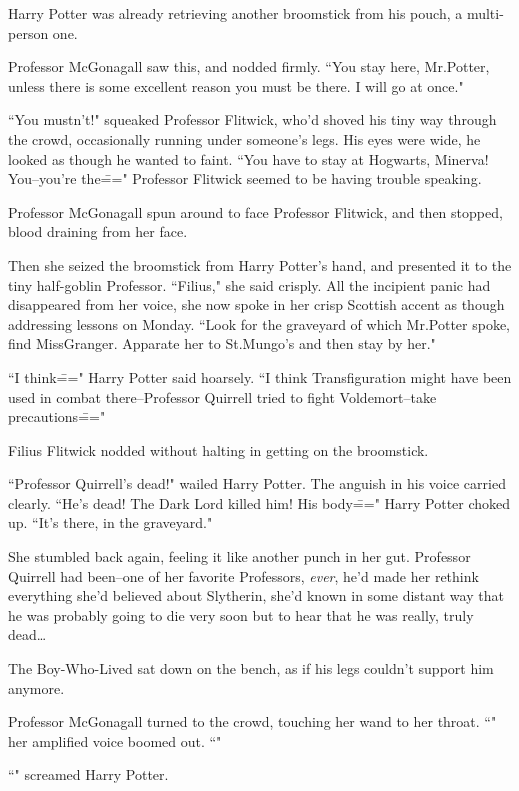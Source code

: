 Harry Potter was already retrieving another broomstick from his pouch, a multi-person one.

Professor McGonagall saw this, and nodded firmly. ``You stay here, Mr.\?Potter, unless there is some excellent reason you must be there. I will go at once."

``You mustn't!" squeaked Professor Flitwick, who'd shoved his tiny way through the crowd, occasionally running under someone's legs. His eyes were wide, he looked as though he wanted to faint. ``You have to stay at Hogwarts, Minerva! You\---you're the\===" Professor Flitwick seemed to be having trouble speaking.

Professor McGonagall spun around to face Professor Flitwick, and then stopped, blood draining from her face.

Then she seized the broomstick from Harry Potter's hand, and presented it to the tiny half-goblin Professor. ``Filius," she said crisply. All the incipient panic had disappeared from her voice, she now spoke in her crisp Scottish accent as though addressing lessons on Monday. ``Look for the graveyard of which Mr.\?Potter spoke, find Miss\?Granger. Apparate her to St.\?Mungo's and then stay by her."

``I think\===" Harry Potter said hoarsely. ``I think Transfiguration might have been used in combat there\---Professor Quirrell tried to fight Voldemort\---take precautions\==="

Filius Flitwick nodded without halting in getting on the broomstick.

``Professor Quirrell's dead!" wailed Harry Potter. The anguish in his voice carried clearly. ``He's dead! The Dark Lord killed him! His body\===" Harry Potter choked up. ``It's there, in the graveyard."

She stumbled back again, feeling it like another punch in her gut. Professor Quirrell had been\---one of her favorite Professors, \emph{ever}, he'd made her rethink everything she'd believed about Slytherin, she'd known in some distant way that he was probably going to die very soon but to hear that he was really, truly dead{\ldots}

The Boy-Who-Lived sat down on the bench, as if his legs couldn't support him anymore.

Professor McGonagall turned to the crowd, touching her wand to her throat. ``" her amplified voice boomed out. ``"

``" screamed Harry Potter.

